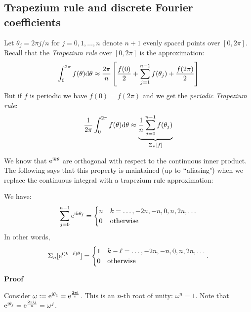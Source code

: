 \subsection{Trapezium rule and discrete Fourier coefficients}
\begin{definition} Let $\ensuremath{\theta}_j = 2\ensuremath{\pi}j/n$ for $j = 0,1,\ensuremath{\ldots},n$ denote $n+1$ evenly spaced points over $[0,2\ensuremath{\pi}]$. Recall that the \emph{Trapezium rule} over $[0,2\ensuremath{\pi}]$ is the approximation:
\[
\ensuremath{\int}_0^{2\ensuremath{\pi}} f(\ensuremath{\theta}) {\rm d}\ensuremath{\theta} \ensuremath{\approx} {2 \ensuremath{\pi} \over n} \left[{f(0) \over 2} + \ensuremath{\sum}_{j=1}^{n-1} f(\ensuremath{\theta}_j) + {f(2 \ensuremath{\pi}) \over 2} \right]
\]
But if $f$ is periodic we have $f(0) = f(2\ensuremath{\pi})$ and we get the \emph{periodic Trapezium rule}:
\[
{1 \over 2\ensuremath{\pi}} \ensuremath{\int}_0^{2\ensuremath{\pi}} f(\ensuremath{\theta}) {\rm d}\ensuremath{\theta} \ensuremath{\approx} \underbrace{{1 \over n} \ensuremath{\sum}_{j=0}^{n-1} f(\ensuremath{\theta}_j)}_{\ensuremath{\Sigma}_n[f]}
\]
\end{definition}

We know that ${\rm e}^{{\rm i} k \ensuremath{\theta}}$ are orthogonal with respect to the continuous inner product. The following says that this property is maintained (up to \ensuremath{\ldq}aliasing") when we replace the continuous integral with a trapezium rule approximation:

\begin{lemma} We have:
\[
\ensuremath{\sum}_{j=0}^{n-1} {\rm e}^{{\rm i} k \ensuremath{\theta}_j} =
\begin{cases} n & k = \ldots,-2n,-n,0,n,2n,\ldots  \cr
              0 & \hbox{otherwise}
\end{cases}
\]
In other words,
\[
\ensuremath{\Sigma}_n[{\rm e}^{{\rm i} (k-\ensuremath{\ell}) \ensuremath{\theta}}] =
\begin{cases} 1 & k-\ensuremath{\ell} = \ldots,-2n,-n,0,n,2n,\ldots  \cr
              0 & \hbox{otherwise}
\end{cases}.
\]
\end{lemma}
\textbf{Proof}

Consider $\ensuremath{\omega} := {\rm e}^{{\rm i} \ensuremath{\theta}_1} = {\rm e}^{2 \ensuremath{\pi} {\rm i} \over n}$. This is an $n$-th root of unity: $\ensuremath{\omega}^n = 1$. Note that ${\rm e}^{{\rm i} \ensuremath{\theta}_j} ={\rm e}^{2 \ensuremath{\pi} {\rm i} j \over n}= \ensuremath{\omega}^j$.


